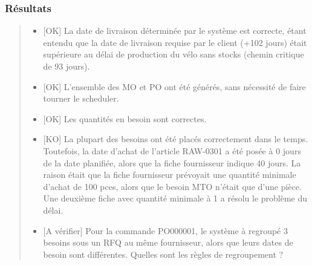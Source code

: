\documentclass[letterpaper,10pt,french]{sphinxmanual}
\begin{document}
\subsubsection{Résultats}
\label{\detokenize{readthedocs/tests/A1_MTO:resultats}}\begin{quote}

\begin{itemize}
\item {} 
{[}OK{]} La date de livraison déterminée par le système est correcte, étant entendu que la date de livraison requise par le client (+102 jours) était supérieure au délai de production du vélo sans stocks (chemin critique de 93 jours).

\item {} 
{[}OK{]} L’ensemble des MO et PO ont été générés, sans nécessité de faire tourner le scheduler.

\item {} 
{[}OK{]} Les quantités en besoin sont correctes.

\item {} 
{[}KO{]} La plupart des besoins ont été placés correctement dans le temps. Toutefois, la date d’achat de l’article RAW-0301 a été posée à 0 jours de la date planifiée, alors que la fiche fournisseur indique 40 jours. La raison était que la fiche fournisseur prévoyait une quantité minimale d’achat de 100 pces, alors que le besoin MTO n’était que d’une pièce. Une deuxième fiche avec quantité minimale à 1 a résolu le problème du délai.

\item {} 
{[}A vérifier{]} Pour la commande PO000001, le système à regroupé 3 besoins sous un RFQ au même fournisseur, alors que leurs dates de besoin sont différentes. Quelles sont les règles de regroupement ?

\end{itemize}
\end{quote}
\end{document}
